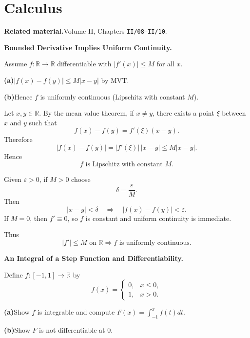 \section{Calculus}

\par\medskip\noindent\textbf{Related material.}\quad  Volume II, Chapters \texttt{II/08--II/10}.

\begin{problem}[CP-II-0010]
\label{prob:cp-ii-0010}
\textbf{Bounded Derivative Implies Uniform Continuity.}

\hspace*{1.5em}Assume $f:\mathbb{R}\to\mathbb{R}$ differentiable with $|f'(x)|\le M$ for all $x$.

\par\smallskip\noindent\textbf{(a)}\quad $|f(x)-f(y)|\le M|x-y|$ by MVT.
\par\smallskip\noindent\textbf{(b)}\quad Hence $f$ is uniformly continuous (Lipschitz with constant $M$).
\end{problem}

\begin{solution}
Let \(x,y\in\mathbb R\). By the mean value theorem, if \(x\neq y\), there exists a point
\(\xi\) between \(x\) and \(y\) such that
\[
f(x)-f(y)=f'(\xi)(x-y).
\]
Therefore
\[
|f(x)-f(y)|
=
|f'(\xi)|\,|x-y|
\le
M|x-y|.
\]
Hence
\[
\boxed{f\text{ is Lipschitz with constant }M.}
\]

Given \(\varepsilon>0\), if \(M>0\) choose
\[
\delta=\frac{\varepsilon}{M}.
\]
Then
\[
|x-y|<\delta
\quad\Longrightarrow\quad
|f(x)-f(y)|<\varepsilon.
\]
If \(M=0\), then \(f'\equiv0\), so \(f\) is constant and uniform continuity is immediate.

Thus
\[
\boxed{|f'|\le M\text{ on }\mathbb R\Longrightarrow f\text{ is uniformly continuous}.}
\]
\end{solution}


\begin{problem}[CP-II-0012]
\label{prob:cp-ii-0012}
\textbf{An Integral of a Step Function and Differentiability.}

\hspace*{1.5em}Define $f:[-1,1]\to\mathbb{R}$ by
\[
f(x)=\begin{cases}
	0,& x\leq 0,\\
	1,& x>0.
\end{cases}
\]

	\par\smallskip\noindent\textbf{(a)}\quad Show $f$ is integrable and compute $F(x)=\int_{-1}^x f(t)dt$.
	\par\smallskip\noindent\textbf{(b)}\quad Show $F$ is not differentiable at $0$.
\end{problem}

